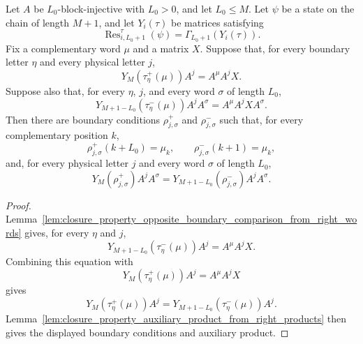 \begin{lemma}
    \label{lem:closure_property_auxiliary_product_from_opposite_boundary_words}
    \leanok
    Let $A$ be $L_0$-block-injective with $L_0>0$, and let $L_0\le M$.
    Let $\psi$ be a state on the chain of length $M+1$, and let
    $Y_i(\tau)$ be matrices satisfying
    \[
        \operatorname{Res}^{\tau}_{i,L_0+1}(\psi)
        =
        \Gamma_{L_0+1}(Y_i(\tau)).
    \]
    Fix a complementary word $\mu$ and a matrix $X$. Suppose that, for every
    boundary letter $\eta$ and every physical letter $j$,
    \[
        Y_M(\tau^+_{\eta}(\mu))A^j
        =
        A^\mu A^jX .
    \]
    Suppose also that, for every $\eta$, $j$, and every word $\sigma$ of length
    $L_0$,
    \[
        Y_{M+1-L_0}(\tau^-_{\eta}(\mu))A^jA^\sigma
        =
        A^\mu A^jXA^\sigma .
    \]
    Then there are boundary conditions $\rho^+_{j,\sigma}$ and
    $\rho^-_{j,\sigma}$ such that, for every complementary position $k$,
    \[
        \rho^+_{j,\sigma}(k+L_0)=\mu_k,
        \qquad
        \rho^-_{j,\sigma}(k+1)=\mu_k,
    \]
    and, for every physical letter $j$ and every word $\sigma$ of length
    $L_0$,
    \[
        Y_M(\rho^+_{j,\sigma})A^jA^\sigma
        =
        Y_{M+1-L_0}(\rho^-_{j,\sigma})A^jA^\sigma.
    \]
\end{lemma}

\begin{proof}
    \leanok
    Lemma~\ref{lem:closure_property_opposite_boundary_comparison_from_right_words}
    gives, for every $\eta$ and $j$,
    \[
        Y_{M+1-L_0}(\tau^-_{\eta}(\mu))A^j
        =
        A^\mu A^jX .
    \]
    Combining this equation with
    \[
        Y_M(\tau^+_{\eta}(\mu))A^j=A^\mu A^jX
    \]
    gives
    \[
        Y_M(\tau^+_{\eta}(\mu))A^j
        =
        Y_{M+1-L_0}(\tau^-_{\eta}(\mu))A^j .
    \]
    Lemma~\ref{lem:closure_property_auxiliary_product_from_right_products}
    then gives the displayed boundary conditions and auxiliary product.
\end{proof}

